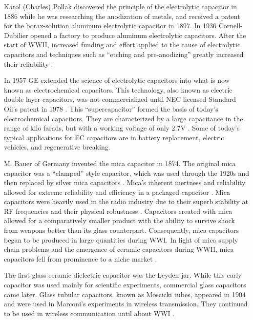 Karol (Charles) Pollak discovered the principle of the electrolytic capacitor in 1886 while he was researching the anodization of metals, and received a patent for the borax-solution aluminum electrolytic capacitor in 1897.
In 1936 Cornell-Dubilier opened a factory to produce aluminum electrolytic capacitors.
After the start of WWII, increased funding and effort applied to the cause of electrolytic capacitors and techniques such as ``etching and pre-anodizing'' greatly increased their reliability \cite{deis_hist}\cite{wiki_elec}.

In 1957 GE extended the science of electrolytic capacitors into what is now known as electrochemical capacitors. This technology, also known as electric double layer capacitors, was not commercialized until NEC licensed Standard Oil's patent in 1978 \cite{electrochem_intro}. This ``supercapacitor'' formed the basis of today's electrochemical capacitors. They are characterized by a large capacitance in the range of kilo farads, but with a working voltage of only 2.7V \cite{electrochem_intro}. Some of today's typical applications for EC capacitors are in battery replacement, electric vehicles, and regenerative breaking.

\nocite{hh}
\nocite{capGuide_mica}
M. Bauer of Germany invented the mica capacitor in 1874. The original mica capacitor was a ``clamped'' style capacitor, which was used through the 1920s \cite{wiki_mica} and then replaced by silver mica capacitors \cite{learn_caps}.
Mica's inherent inertness and reliability allowed for extreme reliability and efficiency in a packaged capacitor \cite{tedds_mica}. Mica capacitors were heavily used in the radio industry due to their superb stability at RF frequencies and their physical robustness \cite{radio_mica}.
Capacitors created with mica allowed for a comparatively smaller product \cite[f.~37-41]{dumInv} with the ability to survive shock from weapons better than its glass counterpart. Consequently, mica capacitors began to be produced in large quantities during WWI.
In light of mica supply chain problems and the emergence of ceramic capacitors during WWII, mica capacitors fell from prominence to a niche market \cite[Ch 3, Sec II]{cerMaterials}.

The first glass ceramic dielectric capacitor was the Leyden jar. While this early capacitor was used mainly for scientific experiments, commercial glass capacitors came later.
Glass tubular capacitors, known as Moscicki tubes, appeared in 1904 and were used in Marconi's experiments in wireless transmission. They continued to be used in wireless communication until about WWI \cite[p.~102]{dumInv}.

